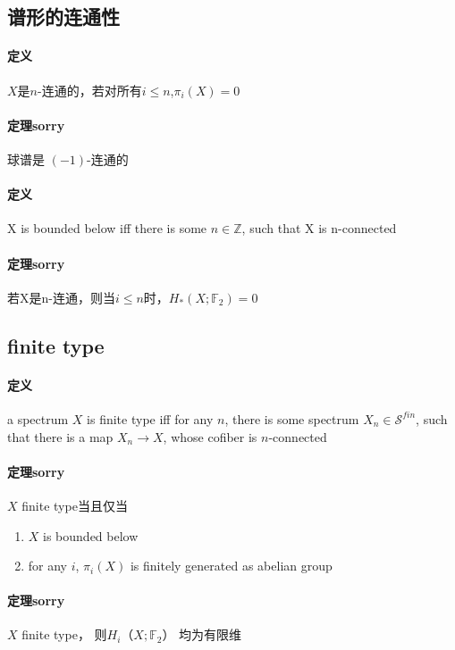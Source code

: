 \documentclass[12pt,a4paper]{article}
\begin{document}
\begin{sloppy}
\subsection{谱形的连通性}
\paragraph{定义}$X$是$n$-连通的，若对所有$i\leq n$,$\pi_i(X)=0$

\paragraph{定理sorry}
球谱是 $(-1)$-连通的

\paragraph{定义}X is bounded below iff there is some $n\in \mathbb{Z}$, such that X is n-connected

\paragraph{定理sorry} 若X是n-连通，则当$i\leq n$时，$H_*(X;\mathbb{F}_2) = 0$

\subsection{finite type}
\paragraph{定义} a spectrum $X$ is finite type iff
for any $n$, there is some spectrum $X_n\in \mathcal{S}^{fin}$, such that there is a map
$X_n\xrightarrow{}X$, whose cofiber is $n$-connected

\paragraph{定理sorry}$X$ finite type当且仅当
\begin{enumerate}
    \item $X$ is bounded below
    \item for any $i$, $\pi_i(X)$ is finitely generated as abelian group
\end{enumerate}

\paragraph{定理sorry}
$X$ finite type， 则$H_i（X;\mathbb{F}_2）$ 均为有限维


\end{sloppy}
\end{document}
